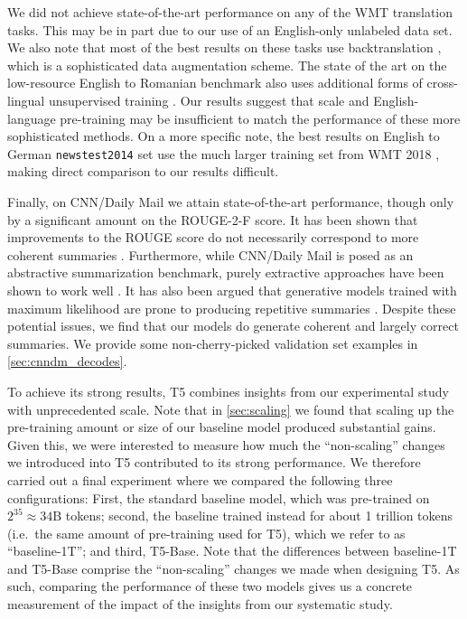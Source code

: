 We did not achieve state-of-the-art performance on any of the WMT translation tasks. This may be in part due to our use of an English-only unlabeled data set. We also note that most of the best results on these tasks use backtranslation \citep{edunov2018understanding,lample2019cross}, which is a sophisticated data augmentation scheme. The state of the art on the low-resource English to Romanian benchmark also uses additional forms of cross-lingual unsupervised training \citep{lample2019cross}. Our results suggest that scale and English-language pre-training may be insufficient to match the performance of these more sophisticated methods. On a more specific note, the best results on English to German \texttt{newstest2014} set use the much larger training set from WMT 2018 \citep{edunov2018understanding}, making direct comparison to our results difficult.

Finally, on CNN/Daily Mail we attain state-of-the-art performance, though only by a significant amount on the ROUGE-2-F score. It has been shown that improvements to the ROUGE score do not necessarily correspond to more coherent summaries \citep{paulus2017deep}. Furthermore, while CNN/Daily Mail is posed as an abstractive summarization benchmark, purely extractive approaches have been shown to work well \citep{liu2019fine}. It has also been argued that generative models trained with maximum likelihood are prone to producing repetitive summaries \citep{see2017get}. Despite these potential issues, we find that our models do generate coherent and largely correct summaries. We provide some non-cherry-picked validation set examples in \ref{sec:cnndm_decodes}.

To achieve its strong results, T5 combines insights from our experimental study with unprecedented scale. Note that in \ref{sec:scaling} we found that scaling up the pre-training amount or size of our baseline model produced substantial gains. Given this, we were interested to measure how much the ``non-scaling'' changes we introduced into T5 contributed to its strong performance. We therefore carried out a final experiment where we compared the following three configurations: First, the standard baseline model, which was pre-trained on $2^{35} \approx 34\mathrm{B}$ tokens; second, the baseline trained instead for about 1 trillion tokens (i.e.\ the same amount of pre-training used for T5), which we refer to as ``baseline-1T''; and third, T5-Base. Note that the differences between baseline-1T and T5-Base comprise the ``non-scaling'' changes we made when designing T5. As such, comparing the performance of these two models gives us a concrete measurement of the impact of the insights from our systematic study.

